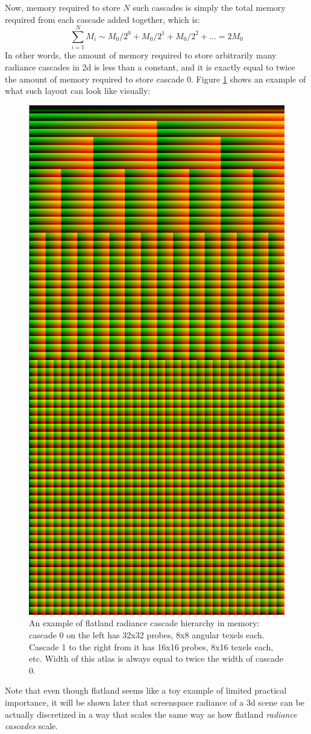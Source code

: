 \documentclass{jcgt}
\begin{document}
Now, memory required to store $N$ such cascades is simply the total memory required from each cascade added together, which is:
\begin{equation}
  \sum_{i=1}^{N}M_i\sim M_0/2^0+M_0/2^1+M_0/2^2+... = 2M_0
  \label{eq:constant_cost}
\end{equation}
In other words, the amount of memory required to store arbitrarily many radiance cascades in 2d is less than a constant, and it is exactly equal to twice the amount of memory required to store cascade 0. Figure \ref {fig:flatland_cascades} shows an example of what such layout can look like visually:
\begin{figure}[htb]
  \centering
  \includegraphics[height=\columnwidth, angle=-90]{images/flatland_cascades.png}
  \caption{\label{fig:flatland_cascades}
     An example of flatland radiance cascade hierarchy in memory: cascade 0 on the left has 32x32 probes, 8x8 angular texels each. Cascade 1 to the right from it has 16x16 probes, 8x16 texels each, etc. Width of this atlas is always equal to twice the width of cascade 0. }
\end{figure}

Note that even though flatland seems like a toy example of limited practical importance, it will be shown later that screenspace radiance of a 3d scene can be actually discretized in a way that scales the same way as how flatland \emph{radiance cascades} scale.
\end{document}
